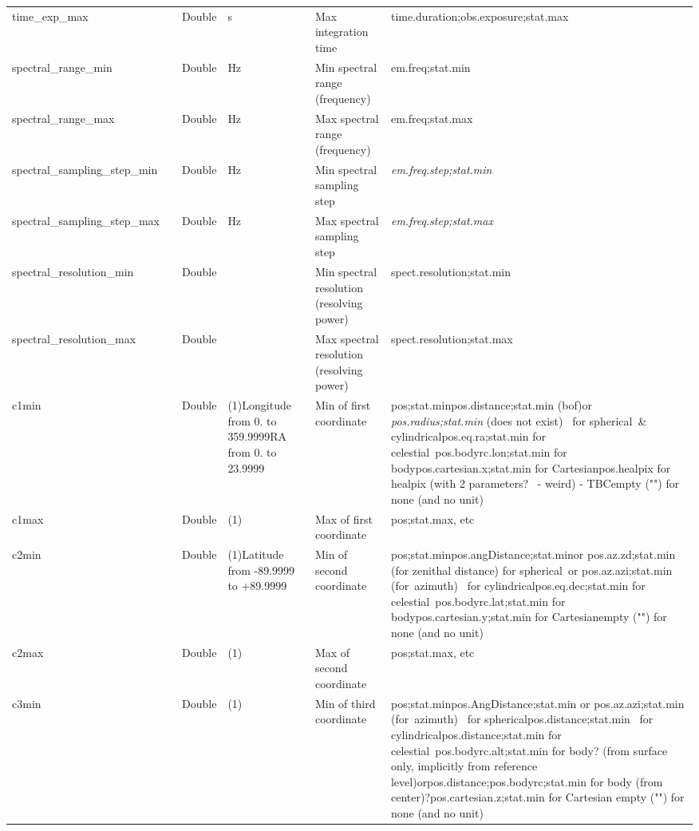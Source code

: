 \documentclass[11pt,a4paper]{ivoa}
\begin{document}
\begin{longtable}{p{3.5cm}p{0.5cm}p{1cm}p{1cm}p{7cm}p{3cm}}
\\
time\_exp\_max&&Double&s&Max integration time&



time.duration;obs.exposure;stat.max











\\
spectral\_range\_min&&Double&Hz&Min spectral range (frequency)&em.freq;stat.min\\
spectral\_range\_max&&Double&Hz&Max spectral range (frequency)&em.freq;stat.max\\
spectral\_sampling\_step\_min&&Double&Hz&Min spectral sampling step&\emph{em.freq.step;stat.min} \\
spectral\_sampling\_step\_max&&Double&Hz&Max spectral sampling step&\emph{em.freq.step;stat.max }\\
spectral\_resolution\_min&&Double&&Min spectral resolution (resolving power)&spect.resolution;stat.min\\
spectral\_resolution\_max&&Double&&Max spectral resolution (resolving power)&spect.resolution;stat.max\\
c1min&&Double&(1)Longitude from 0. to 359.9999RA from 0. to 23.9999&Min of first coordinate&pos;stat.minpos.distance;stat.min (bof)or \emph{pos.radius;stat.min} (does not exist)  for spherical \& cylindricalpos.eq.ra;stat.min for celestial pos.bodyrc.lon;stat.min for bodypos.cartesian.x;stat.min for Cartesianpos.healpix for healpix (with 2 parameters?  - weird) - TBCempty ("") for none (and no unit)\\
c1max&&Double&(1)&Max of first coordinate&pos;stat.max, etc\\
c2min&&Double&(1)Latitude from -89.9999 to +89.9999&Min of second coordinate&pos;stat.minpos.angDistance;stat.minor pos.az.zd;stat.min (for zenithal distance) for spherical or pos.az.azi;stat.min (for azimuth)  for cylindricalpos.eq.dec;stat.min for celestial pos.bodyrc.lat;stat.min for bodypos.cartesian.y;stat.min for Cartesianempty ("") for none (and no unit)\\
c2max&&Double&(1)&Max of second coordinate&pos;stat.max, etc\\
c3min&&Double&(1)&Min of third coordinate&pos;stat.minpos.AngDistance;stat.min or pos.az.azi;stat.min (for azimuth)  for sphericalpos.distance;stat.min  for cylindricalpos.distance;stat.min for celestial pos.bodyrc.alt;stat.min for body? (from surface only, implicitly from reference level)orpos.distance;pos.bodyrc;stat.min for body (from center)?pos.cartesian.z;stat.min for Cartesian empty ("") for none (and no unit)\\

\end{longtable}
\end{document}
